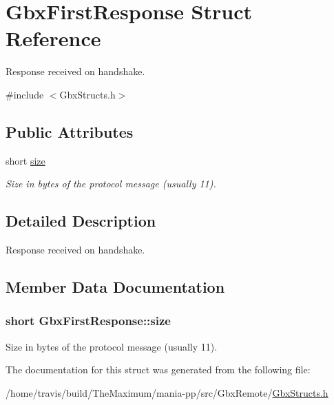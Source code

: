 \hypertarget{structGbxFirstResponse}{\section{Gbx\-First\-Response Struct Reference}
\label{structGbxFirstResponse}
}


Response received on handshake.  




{\ttfamily \#include $<$Gbx\-Structs.\-h$>$}

\subsection*{Public Attributes}
\begin{DoxyCompactItemize}
\item 
short \hyperlink{structGbxFirstResponse_ad93a9c67024b28ecddb779457dd001f8}{size}
\begin{DoxyCompactList}\small\item\em Size in bytes of the protocol message (usually 11). \end{DoxyCompactList}\end{DoxyCompactItemize}


\subsection{Detailed Description}
Response received on handshake. 

\subsection{Member Data Documentation}
\hypertarget{structGbxFirstResponse_ad93a9c67024b28ecddb779457dd001f8}{
\subsubsection[{size}]{\setlength{\rightskip}{0pt plus 5cm}short Gbx\-First\-Response\-::size}}\label{structGbxFirstResponse_ad93a9c67024b28ecddb779457dd001f8}


Size in bytes of the protocol message (usually 11). 



The documentation for this struct was generated from the following file\-:\begin{DoxyCompactItemize}
\item 
/home/travis/build/\-The\-Maximum/mania-\/pp/src/\-Gbx\-Remote/\hyperlink{GbxStructs_8h}{Gbx\-Structs.\-h}\end{DoxyCompactItemize}
